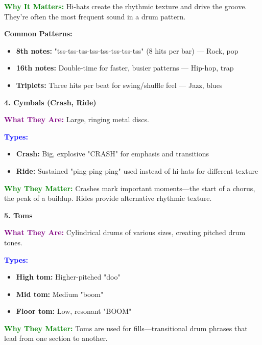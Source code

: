\documentclass[11pt,letterpaper]{article}
\newcommand{\purple}[1]{\textcolor{purple}{\textbf{#1}}}
\newcommand{\bluepurple}[1]{\textcolor{blue}{\textbf{#1}}}
\newcommand{\greentext}[1]{\textcolor{green}{\textbf{#1}}}
\begin{document}
\textbf{\greentext{Why It Matters:}} Hi-hats create the rhythmic texture and drive the groove. They're often the most frequent sound in a drum pattern.

\textbf{Common Patterns:}
\begin{itemize}[leftmargin=*]
\item \textbf{8th notes:} "tss-tss-tss-tss-tss-tss-tss-tss" (8 hits per bar) — Rock, pop
\item \textbf{16th notes:} Double-time for faster, busier patterns — Hip-hop, trap
\item \textbf{Triplets:} Three hits per beat for swing/shuffle feel — Jazz, blues
\end{itemize}

\vspace{0.5cm}

\textbf{4. Cymbals (Crash, Ride)}

\textbf{\purple{What They Are:}} Large, ringing metal discs.

\textbf{\bluepurple{Types:}}
\begin{itemize}[leftmargin=*]
\item \textbf{Crash:} Big, explosive "CRASH" for emphasis and transitions
\item \textbf{Ride:} Sustained "ping-ping-ping" used instead of hi-hats for different texture
\end{itemize}

\textbf{\greentext{Why They Matter:}} Crashes mark important moments—the start of a chorus, the peak of a buildup. Rides provide alternative rhythmic texture.

\vspace{0.5cm}

\textbf{5. Toms}

\textbf{\purple{What They Are:}} Cylindrical drums of various sizes, creating pitched drum tones.

\textbf{\bluepurple{Types:}}
\begin{itemize}[leftmargin=*]
\item \textbf{High tom:} Higher-pitched "doo"
\item \textbf{Mid tom:} Medium "boom"
\item \textbf{Floor tom:} Low, resonant "BOOM"
\end{itemize}

\textbf{\greentext{Why They Matter:}} Toms are used for fills—transitional drum phrases that lead from one section to another.

\vspace{0.5cm}
\end{document}
